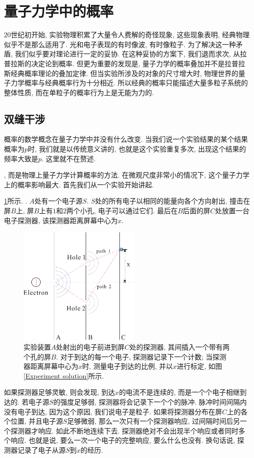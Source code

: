 \documentclass[a4paper,11pt]{book}
\begin{document}
\section{量子力学中的概率}
$20$世纪初开始, 实验物理积累了大量令人费解的奇怪现象, 这些现象表明, 经典物理似乎不是那么适用了. 光和电子表现的有时像波, 有时像粒子. 为了解决这一种矛盾, 我们似乎要对理论进行一定的妥协. 在这种妥协的方案下, 我们退而求次, 从拉普拉斯的决定论到概率. 但更为重要的发现是, 量子力学的概率叠加并不是拉普拉斯经典概率理论的叠加定律. 但当实验所涉及的对象的尺寸增大时, 物理世界的量子力学概率与经典概率行为十分相近. 所以经典的概率只能描述大量多粒子系统的整体性质, 而在单粒子的概率行为上是无能为力的.
\subsection{双缝干涉}
概率的数学概念在量子力学中并没有什么改变. 当我们说一个实验结果的某个结果概率为$p$时, 我们就是以传统意义讲的,  也就是这个实验重复多次, 出现这个结果的频率大致是$p$. 这里就不在赘述.

, 而是物理上量子力学计算概率的方法. 在微观尺度非常小的情况下, 这个量子力学上的概率影响最大. 首先我们从一个实验开始讲起.

\ref{pic-electron}所示. . $A$处有一个电子源$S$. $S$处的所有电子以相同的能量向各个方向射出,  撞击在屏$B$上, 屏$B$上有$1$和$2$两个小孔, 电子可以通过它们. 最后在$B$后面的屏$C$处放置一台电子探测器, 该探测器距离屏幕中心为$x$.
\begin{figure}[H]
  \centering
  \includegraphics[width=6cm]{fig4.pdf}
  \caption{实验装置$A$处射出的电子前进到屏$C$处的探测器, 其间插入一个带有两个孔的屏$B$. 对于到达的每一个电子, 探测器记录下一个计数; 当探测器距离屏幕中心为$x$时, 测量电子到达的比例, 并以$x$进行标定, 如图\ref{Experiment solution}所示.}\label{pic-electron}
\end{figure}
如果探测器足够灵敏, 则会发现, 到达$x$的电流不是连续的, 而是一个个电子相继到达的. 若电子源$S$的强度足够弱, 探测器将会记录下一个个的脉冲. 脉冲时间间隔内没有电子到达, 因为这个原因, 我们说电子是粒子. 如果将探测器分布在屏$C$上的各个位置, 并且电子源$S$足够微弱, 那么一次只有一个探测器响应, 过间隔时间后另一个探测器才响应. 如此不断地连续下去. 探测器绝对不会出现半个响应或者同时多个响应. 也就是说, 要么一次一个电子的完整响应, 要么什么也没有. 换句话说, 探测器记录了电子从源$S$到$x$的经历.
\end{document}
